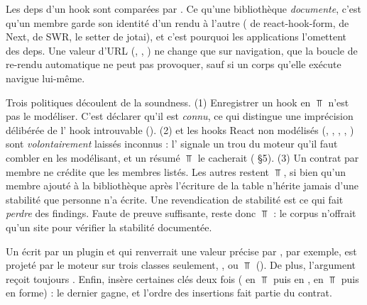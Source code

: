 \begin{react}
Les deps d'un hook sont comparées par . Ce qu'une bibliothèque \emph{documente}, c'est qu'un membre garde son identité d'un rendu à l'autre ( de react-hook-form,  de Next,  de SWR, le setter de jotai), et c'est pourquoi les applications l'omettent des deps. Une valeur d'URL (, , ) ne change que sur navigation, que la boucle de re-rendu automatique ne peut pas provoquer, sauf si un corps qu'elle exécute navigue lui-même.
\end{react}

\begin{decision}
Trois politiques découlent de la soundness. (1) Enregistrer un hook en $\Top$ n'est pas le modéliser. C'est déclarer qu'il est \emph{connu}, ce qui distingue une imprécision délibérée de l'\Info{} \og hook introuvable\fg{} (). (2)  et les hooks React non modélisés (, , , , ) sont \emph{volontairement} laissés inconnus : l'\Info{} signale un trou du moteur qu'il faut combler en les modélisant, et un résumé $\Top$ le cacherait ( §5). (3) Un contrat par membre ne crédite que les membres listés. Les autres restent $\Top$, si bien qu'un membre ajouté à la bibliothèque après l'écriture de la table n'hérite jamais d'une stabilité que personne n'a écrite. Une revendication de stabilité est ce qui fait \emph{perdre} des findings. Faute de preuve suffisante,  reste donc $\Top$ : le corpus n'offrait qu'un site pour vérifier la stabilité documentée.
\end{decision}

\begin{piege}
Un  écrit par un plugin et qui renverrait une valeur précise par ,  par exemple, est projeté par le moteur sur trois classes seulement, ,  ou $\Top$ (). De plus, l'argument  reçoit toujours \code{\&[]}. Enfin,  insère certaines clés deux fois ( en $\Top$ puis en ,  en $\Top$ puis en forme) : le dernier  gagne, et l'ordre des insertions fait partie du contrat.
\end{piege}

